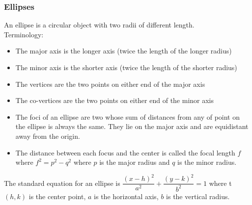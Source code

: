\subsubsection{Ellipses}
An ellipse is a circular object with two radii of different length.\\
Terminology:
\begin{itemize}
    \item The major axis is the longer axis (twice the length of the longer radius)
    \item The minor axis is the shorter axis (twice the length of the shorter radius)
    \item The vertices are the two points on either end of the major axis
    \item The co-vertices are the two points on either end of the minor axis
    \item The foci of an ellipse are two whose sum of distances from any of point on the ellipse is always the same. They lie on the major axis and are equidistant away from the origin.
    \item The distance between each focus and the center is called the focal length $f$ where $f^2=p^2-q^2$ where $p$ is the major radius and $q$ is the minor radius.
\end{itemize}
The standard equation for an ellipse is $\dfrac{(x-h)^2}{a^2}+\dfrac{(y-k)^2}{b^2}=1$ where t $(h,k)$ is the center point, $a$ is the horizontal axis, $b$ is the vertical radius.

